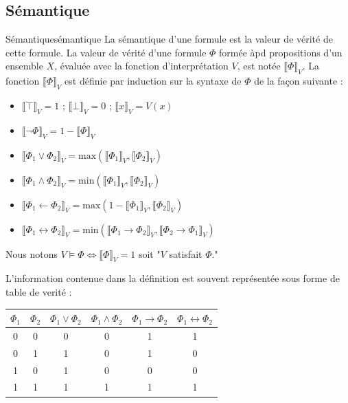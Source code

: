 \documentclass[a4paper, 12pt]{extarticle}
\begin{document}
\subsection{Sémantique}
\begin{definition}{Sémantique}{sémantique}
La sémantique d'une formule est la valeur de vérité de cette formule. La valeur de vérité d'une formule
$\Phi$ formée àpd propositions d'un ensemble $X$, évaluée avec la fonction d'interprétation $V$, est notée $\llbracket \Phi \rrbracket_V$.
La fonction $\llbracket \Phi \rrbracket_V$ est définie par induction sur la syntaxe de $\Phi$ de la façon suivante :
\begin{itemize}[label=$\bullet$]
  \item $\llbracket \top\rrbracket_V = 1$ ; $\llbracket \bot\rrbracket_V = 0$ ; $\llbracket x\rrbracket_V = V(x)$
  \item $\llbracket \neg \Phi\rrbracket_V = 1 - \llbracket \Phi\rrbracket_V$
  \item $\llbracket \Phi_1 \vee \Phi_2\rrbracket_V = \text{max}(\llbracket\Phi_1\rrbracket_V,\llbracket\Phi_2\rrbracket_V)$
  \item $\llbracket \Phi_1 \land \Phi_2\rrbracket_V = \text{min}(\llbracket\Phi_1\rrbracket_V,\llbracket\Phi_2\rrbracket_V)$
  \item $\llbracket \Phi_1 \leftarrow \Phi_2\rrbracket_V = \text{max}(1 - \llbracket\Phi_1\rrbracket_V,\llbracket\Phi_2\rrbracket_V)$
  \item $\llbracket \Phi_1 \leftrightarrow \Phi_2\rrbracket_V = \text{min}(\llbracket\Phi_1\rightarrow\Phi_2\rrbracket_V,\llbracket\Phi_2\rightarrow\Phi_1\rrbracket_V)$
\end{itemize}
Nous notons $V\vDash\Phi\Leftrightarrow\llbracket\Phi\rrbracket_V=1$ soit "$V$ satisfait $\Phi$."
\end{definition}

L'information contenue dans la définition est souvent représentée sous forme de table de verité : 
\begin{center}
  \begin{tabular}{|c|c|c|c|c|c|}
    \hline 
    $\Phi_1$ & $\Phi_2$ & $\Phi_1\vee\Phi_2$ & $\Phi_1\wedge\Phi_2$ & $\Phi_1\rightarrow\Phi_2$ & $\Phi_1\leftrightarrow\Phi_2$ \\ 
    \hline 
    0 & 0 & 0 & 0 & 1 & 1 \\ 
    \hline 
    0 & 1 & 1 & 0 & 1 & 0 \\ 
    \hline 
    1 & 0 & 1 & 0 & 0 & 0 \\ 
    \hline 
    1 & 1 & 1 & 1 & 1 & 1 \\ 
    \hline 
  \end{tabular}
\end{center}
\end{document}
